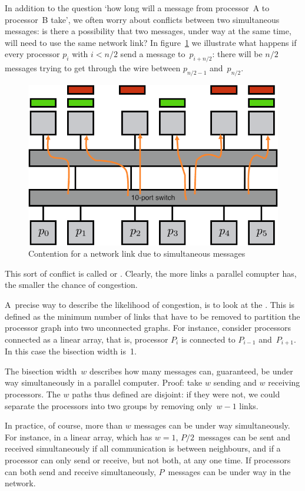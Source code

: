 In addition to the question `how long will a message from processor~A
to processor~B take', we often worry about conflicts between two
simultaneous messages: is there a possibility that two messages, under
way at the same time, will need to use the same network link? In
figure~\ref{fig:contention} we illustrate what happens if every
processor $p_i$ with $i<n/2$ send a message to~$p_{i+n/2}$: there will
be $n/2$ messages trying to get through the wire between $p_{n/2-1}$
and~$p_{n/2}$.
\begin{figure}[ht]
  \includegraphics[scale=.09]{graphics/contention}
  \caption{Contention for a network link due to simultaneous messages}
  \label{fig:contention}
\end{figure}
This
sort of conflict is called  or
. Clearly, the more links a
parallel comupter has, the smaller the chance of congestion.

A~precise way to describe the likelihood of congestion, is
to look at the . This is defined as the
minimum number of links that have to be removed to partition the
processor graph into two unconnected graphs. For instance, consider
processors connected as a linear array, that is, processor $P_i$ is
connected to $P_{i-1}$ and~$P_{i+1}$. In this case the bisection width
is~1.

The bisection width~$w$ describes how many messages can, guaranteed,
be under way simultaneously in a parallel computer. Proof: take $w$
sending and $w$ receiving processors. The $w$ paths thus defined are
disjoint: if they were not, we could separate the processors into two
groups by removing only~$w-1$ links. 

In practice, of course, more than
$w$ messages can be under way simultaneously. For instance, in a
linear array, which has $w=1$, $P/2$~messages can be sent and received
simultaneously if all communication is between neighbours, and if a
processor can only send or receive, but not both, at any one time. If
processors can both send and receive simultaneously, $P$~messages can
be under way in the network.

